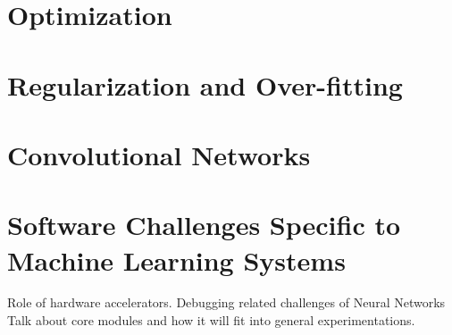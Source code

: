 \section{Optimization} \label{sec:optimization}

\section{Regularization and Over-fitting} \label{sec:regularization}

\section{Convolutional Networks} \label{sec:convnets}

\section{Software Challenges Specific to 
Machine Learning Systems} \label{sec:engchallenge}
Role of hardware accelerators. Debugging related challenges of Neural Networks
Talk about core modules and how it will fit into general experimentations. 
\clearpage